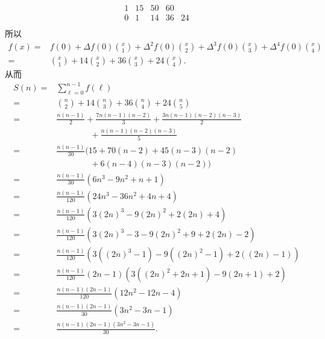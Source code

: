 \begin{example}
\begin{align*}
{\begin{array}{ccccc}
                    1   & 15  & 50  & 60 & \  \\
                    0   & 1   & 14  & 36 & 24 \\
                \end{array}
            }
    \end{align*}
    所以
    \begin{align*}
        f(x)
        = {} & f(0) + \Delta f(0) \binom{x}{1} + \Delta^2 f(0) \binom{x}{2} + \Delta^3 f(0) \binom{x}{3} + \Delta^4 f(0) \binom{x}{4} \\
        = {} & \binom{x}{1} + 14 \binom{x}{2} + 36 \binom{x}{3} + 24 \binom{x}{4}.
    \end{align*}
    从而
    \begin{align*}
        S(n)
        = {} & \sum_{\ell = 0}^{n - 1} f(\ell)                                         \\
        = {} & \binom{n}{2} + 14 \binom{n}{3} + 36 \binom{n}{4} + 24 \binom{n}{5}      \\
        = {} & \frac{n(n-1)}{2} + \frac{7n(n-1)(n-2)}{3} + \frac{3n(n-1)(n-2)(n-3)}{2} \\
             & \qquad \qquad + \frac{n(n-1)(n-2)(n-3)}{5}                              \\
        = {} & \frac{n(n-1)}{30} (15 + 70(n-2) + 45(n-3)(n-2)                          \\
             & \qquad \qquad + 6(n-4)(n-3)(n-2))                                       \\
        = {} & \frac{n(n-1)}{30} (6n^3 - 9n^2 + n + 1)                                 \\
        = {} & \frac{n(n-1)}{120} (24n^3 - 36n^2 + 4n + 4)                             \\
        = {} & \frac{n(n-1)}{120} (3(2n)^3 - 9(2n)^2 + 2(2n) + 4)                      \\
        = {} & \frac{n(n-1)}{120} (3(2n)^3 - 3 - 9(2n)^2 + 9 + 2(2n) - 2)              \\
        = {} & \frac{n(n-1)}{120} (3((2n)^3 - 1) - 9((2n)^2 - 1) + 2((2n) - 1))        \\
        = {} & \frac{n(n-1)}{120} (2n-1) (3((2n)^2 + 2n + 1) - 9(2n + 1) + 2)          \\
        = {} & \frac{n(n-1)(2n-1)}{120} (12n^2 - 12n - 4)                              \\
        = {} & \frac{n(n-1)(2n-1)}{30} (3n^2 - 3n - 1)                                 \\
        = {} & \frac{n(n-1)(2n-1)(3n^2 - 3n - 1)}{30}.
    \end{align*}
\end{example}
